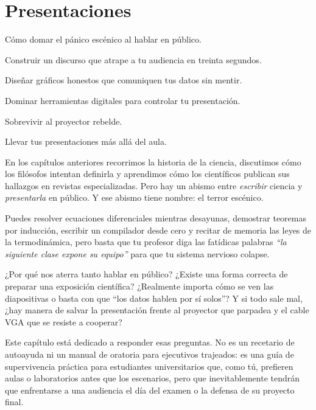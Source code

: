 \chapter{Presentaciones}
\label{cha:presentaciones}

\begin{enestecapitulo}
	\item[\emoji{fearful-face}] Cómo domar el pánico escénico al hablar en público.
	\item[\emoji{building-construction}] Construir un discurso que atrape a tu audiencia en treinta segundos.
	\item[\emoji{bar-chart}] Diseñar gráficos honestos que comuniquen tus datos sin mentir.
	\item[\emoji{desktop-computer}] Dominar herramientas digitales para controlar tu presentación.
	\item[\emoji{electric-plug}] Sobrevivir al proyector rebelde.
	\item[\emoji{rocket}] Llevar tus presentaciones más allá del aula.
\end{enestecapitulo}

En los capítulos anteriores recorrimos la historia de la ciencia, discutimos cómo los filósofos intentan definirla y aprendimos cómo los científicos publican sus hallazgos en revistas especializadas.
Pero hay un abismo entre \emph{escribir} ciencia y \emph{presentarla} en público.
Y ese abismo tiene nombre: el terror escénico.

Puedes resolver ecuaciones diferenciales mientras desayunas, demostrar teoremas por inducción, escribir un compilador desde cero y recitar de memoria las leyes de la termodinámica, pero basta que tu profesor diga las fatídicas palabras \emph{“la siguiente clase expone su equipo”} para que tu sistema nervioso colapse.

¿Por qué nos aterra tanto hablar en público?
¿Existe una forma correcta de preparar una exposición científica?
¿Realmente importa cómo se ven las diapositivas o basta con que “los datos hablen por sí solos”?
Y si todo sale mal, ¿hay manera de salvar la presentación frente al proyector que parpadea y el cable VGA que se resiste a cooperar?

Este capítulo está dedicado a responder esas preguntas.
No es un recetario de autoayuda ni un manual de oratoria para ejecutivos trajeados: es una guía de supervivencia práctica para estudiantes universitarios que, como tú, prefieren aulas o laboratorios antes que los escenarios, pero que inevitablemente tendrán que enfrentarse a una audiencia el día del examen o la defensa de su proyecto final.

